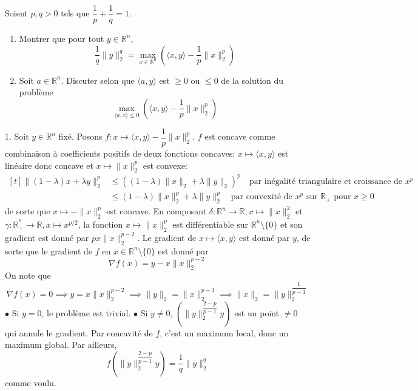 \documentclass{fancybook}
\begin{document}
\begin{exercice}
Soient $p,q>0$ tels que $\dfrac{1}{p} + \dfrac 1q =1$.
\begin{enumerate}
\item Montrer que pour tout $y\in \mathbb R^n$, $$\dfrac 1q \|y\|_2^q = \max_{x\in \mathbb R^n} \left(\langle x,y\rangle - \dfrac 1p \|x\|_2^p \right)$$
\item Soit $a\in \mathbb R^n$. Discuter selon que $\langle a,y \rangle$ est $\geq 0$ ou $\leq 0$ de la solution du problème $$\max_{\langle a,x \rangle\leq 0} \left( \langle x,y \rangle - \dfrac{1}{p}\|x\|_2^p \right)$$
\end{enumerate}
\end{exercice}
1. Soit $y\in \mathbb R^n$ fixé. Posons $f:x\mapsto \langle x,y\rangle - \dfrac 1p \|x\|_2^p$.  $f$ est concave comme combinaison à coefficients positifs de deux fonctions concaves: $x\mapsto \langle x,y\rangle$ est linéaire donc concave et $x\mapsto \|x\|_2^p$ est convexe: $$\begin{aligned}[t]
\|(1-\lambda)x + \lambda y\|_2^p &\leq \left( (1-\lambda)\|x\|_2 + \lambda \|y\|_2\right)^p \quad \text{par inégalité triangulaire et croissance de } x^p\\
&\leq (1-\lambda)\|x\|_2^p + \lambda \|y\|_2^p \quad \text{par convexité de }x^p \text{  sur }\mathbb R_+ \text{ pour }x\geq 0
\end{aligned}$$
de sorte que $x\mapsto -\|x\|_2^p$ est concave.\newline
\newline
En composant $\delta:\mathbb R^n \to \mathbb R, x \mapsto \|x\|_2^2$ et $\gamma:\mathbb R_+^*\to \mathbb R, x\mapsto x^{p/2} $, la fonction $x\mapsto \|x\|_2^p$ est différentiable sur $\mathbb R^n \setminus \{0\}$ et son gradient est donné par $px \|x\|_2^{p-2}$. \newline
Le gradient de $x\mapsto \langle x, y\rangle $ est donné par $y$, de sorte que le gradient de $f$ en $x \in \mathbb R^n \setminus \{0\}$ est donné par $$\nabla f (x) = y-x \|x\|_2^{p-2}$$
On note que $$\nabla f (x) = 0 \implies y=x \|x\|_2^{p-2} \implies \|y\|_2 = \|x\|_2^{p-1} \implies \|x\|_2= \|y\|_2^{\dfrac{1}{p-1}} $$
$\bullet$ Si $y=0$, le problème est trivial.\newline 
$\bullet $ Si $y\neq 0$, $\left( \|y\|_2^{\dfrac{2-p}{p-1}}y\right) $ est un point $\neq 0$ qui annule le gradient. Par concavité de $f$, c'est un maximum local, donc un maximum global. Par ailleurs, $$f(\|y\|_2^{\dfrac{2-p}{p-1}}y) = \dfrac{1}{q}\|y\|_2^q$$ comme voulu.\newline
\end{document}

